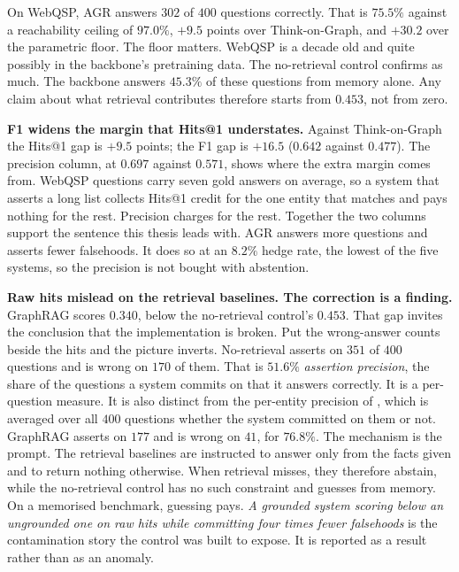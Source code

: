 On WebQSP, AGR answers $302$ of $400$ questions correctly. That is $75.5\%$
against a reachability ceiling of $97.0\%$, $+9.5$
points over Think-on-Graph, and $+30.2$ over the parametric floor. The floor
matters. WebQSP is a decade old and quite possibly in the backbone's pretraining
data. The no-retrieval control confirms as much. The backbone answers $45.3\%$
of these questions from memory alone. Any claim about what retrieval contributes
therefore starts from $0.453$, not from zero.

\textbf{F1 widens the margin that Hits@1 understates.} Against Think-on-Graph
the Hits@1 gap is $+9.5$ points; the F1 gap is $+16.5$ ($0.642$ against
$0.477$). The precision column, at $0.697$ against $0.571$, shows where the
extra margin comes from. WebQSP questions carry seven gold answers on average,
so a system that asserts a long list collects Hits@1 credit for the one entity
that matches and pays nothing for the rest. Precision charges for the rest.
Together the two columns support the sentence this thesis leads with. AGR
answers more questions and asserts fewer falsehoods. It does so at an $8.2\%$
hedge rate, the lowest of the five systems, so the precision is not bought with
abstention.

\textbf{Raw hits mislead on the retrieval baselines. The correction is a
finding.} GraphRAG scores $0.340$, below the no-retrieval control's $0.453$.
That gap invites the conclusion that the implementation is broken. Put the
wrong-answer counts beside the hits and the picture inverts. No-retrieval
asserts on $351$ of $400$ questions and is wrong on $170$ of them. That is
$51.6\%$ \emph{assertion precision}, the share of the
questions a system commits on that it answers correctly. It is a per-question
measure. It is also distinct from the per-entity precision of ,
which is averaged over all $400$ questions whether the system committed on them
or not. GraphRAG asserts on $177$ and is wrong on $41$, for $76.8\%$. The
mechanism is the prompt. The retrieval baselines are instructed to answer only
from the facts given and to return nothing otherwise. When retrieval misses,
they therefore abstain, while the no-retrieval control has no such constraint
and guesses from memory. On a memorised benchmark, guessing pays. \emph{A
grounded system scoring below an ungrounded one on raw hits while committing
four times fewer falsehoods} is the contamination story the control was built to
expose. It is reported as a result rather than as an anomaly.

